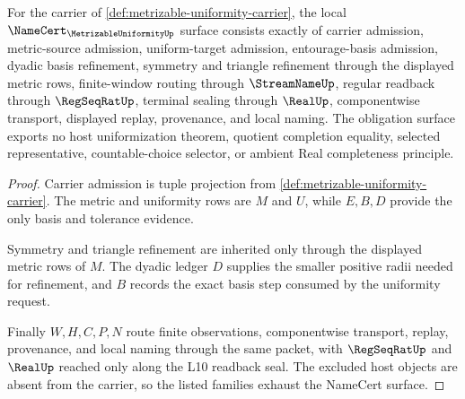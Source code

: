 \begin{theorem}
\label{thm:metrizable-uniformity-namecert-obligations}
For the carrier of \autoref{def:metrizable-uniformity-carrier}, the local $\NameCert_{\MetrizableUniformityUp}$ surface consists exactly of carrier admission, metric-source admission, uniform-target admission, entourage-basis admission, dyadic basis refinement, symmetry and triangle refinement through the displayed metric rows, finite-window routing through $\StreamNameUp$, regular readback through $\RegSeqRatUp$, terminal sealing through $\RealUp$, componentwise transport, displayed replay, provenance, and local naming. The obligation surface exports no host uniformization theorem, quotient completion equality, selected representative, countable-choice selector, or ambient Real completeness principle.
\end{theorem}
\begin{proof}
Carrier admission is tuple projection from \autoref{def:metrizable-uniformity-carrier}. The metric and uniformity rows are $M$ and $U$, while $E,B,D$ provide the only basis and tolerance evidence.

Symmetry and triangle refinement are inherited only through the displayed metric rows of $M$. The dyadic ledger $D$ supplies the smaller positive radii needed for refinement, and $B$ records the exact basis step consumed by the uniformity request.

Finally $W,H,C,P,N$ route finite observations, componentwise transport, replay, provenance, and local naming through the same packet, with $\RegSeqRatUp$ and $\RealUp$ reached only along the L10 readback seal. The excluded host objects are absent from the carrier, so the listed families exhaust the NameCert surface.
\end{proof}



